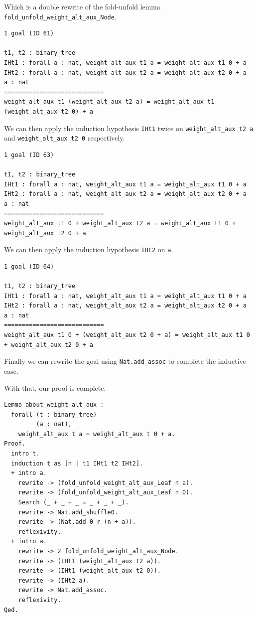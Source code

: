 \documentclass{article}
\begin{document}
Which is a double rewrite of the fold-unfold lemma \texttt{fold\_unfold\_weight\_alt\_aux\_Node}.

\begin{lstlisting}
1 goal (ID 61)

t1, t2 : binary_tree
IHt1 : forall a : nat, weight_alt_aux t1 a = weight_alt_aux t1 0 + a
IHt2 : forall a : nat, weight_alt_aux t2 a = weight_alt_aux t2 0 + a
a : nat
============================
weight_alt_aux t1 (weight_alt_aux t2 a) = weight_alt_aux t1 (weight_alt_aux t2 0) + a
\end{lstlisting}

We can then apply the induction hypothesis \texttt{IHt1} twice on \texttt{weight\_alt\_aux t2 a} and \texttt{weight\_alt\_aux t2 0} respectively.

\begin{lstlisting}
1 goal (ID 63)

t1, t2 : binary_tree
IHt1 : forall a : nat, weight_alt_aux t1 a = weight_alt_aux t1 0 + a
IHt2 : forall a : nat, weight_alt_aux t2 a = weight_alt_aux t2 0 + a
a : nat
============================
weight_alt_aux t1 0 + weight_alt_aux t2 a = weight_alt_aux t1 0 + weight_alt_aux t2 0 + a
\end{lstlisting}

We can then apply the induction hypothesis \texttt{IHt2} on \texttt{a}.

\begin{lstlisting}
1 goal (ID 64)

t1, t2 : binary_tree
IHt1 : forall a : nat, weight_alt_aux t1 a = weight_alt_aux t1 0 + a
IHt2 : forall a : nat, weight_alt_aux t2 a = weight_alt_aux t2 0 + a
a : nat
============================
weight_alt_aux t1 0 + (weight_alt_aux t2 0 + a) = weight_alt_aux t1 0 + weight_alt_aux t2 0 + a
\end{lstlisting}

Finally we can rewrite the goal using \texttt{Nat.add\_assoc} to complete the inductive case.

With that, our proof is complete.

\begin{lstlisting}
Lemma about_weight_alt_aux :
  forall (t : binary_tree)
         (a : nat),
    weight_alt_aux t a = weight_alt_aux t 0 + a.
Proof.
  intro t.
  induction t as [n | t1 IHt1 t2 IHt2].
  + intro a.
    rewrite -> (fold_unfold_weight_alt_aux_Leaf n a).
    rewrite -> (fold_unfold_weight_alt_aux_Leaf n 0).
    Search (_ + _ + _ = _ + _ + _).
    rewrite -> Nat.add_shuffle0.
    rewrite -> (Nat.add_0_r (n + a)).
    reflexivity.
  + intro a.
    rewrite -> 2 fold_unfold_weight_alt_aux_Node.
    rewrite -> (IHt1 (weight_alt_aux t2 a)).
    rewrite -> (IHt1 (weight_alt_aux t2 0)).
    rewrite -> (IHt2 a).
    rewrite -> Nat.add_assoc.
    reflexivity.
Qed.
\end{lstlisting}
\end{document}
